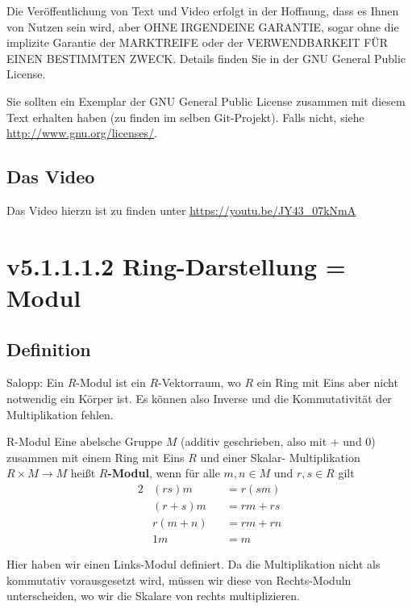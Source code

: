 \documentclass[a4paper]{amsart}
\theoremstyle{definition}
\begin{document}
Die Veröffentlichung von Text und Video erfolgt in der Hoffnung, dass es Ihnen von Nutzen sein wird,
aber OHNE IRGENDEINE GARANTIE, sogar ohne die implizite Garantie der MARKTREIFE oder der
VERWENDBARKEIT FÜR EINEN BESTIMMTEN ZWECK. Details finden Sie in der GNU General Public License.

Sie sollten ein Exemplar der GNU General Public License zusammen mit diesem Text erhalten haben
(zu finden im selben Git-Projekt).
Falls nicht, siehe \url{http://www.gnu.org/licenses/}.

\subsection*{Das Video}
Das Video hierzu ist zu finden unter
{\tiny
   \url{https://youtu.be/JY43_07kNmA}
}

\section{v5.1.1.1.2 Ring-Darstellung = Modul}

\subsection{Definition}
Salopp: Ein $R$-Modul ist ein $R$-Vektorraum, wo $R$ ein Ring mit Eins aber nicht notwendig ein Körper ist. Es können also Inverse und die Kommutativität der Multiplikation fehlen.

\begin{Definition}{R-Modul}
   Eine abelsche Gruppe $M$ (additiv geschrieben, also mit $+$ und $0$) zusammen mit einem  Ring mit Eins $R$ und einer Skalar- Multiplikation $R \times M \to M$ heißt $R$\textbf{-Modul}, wenn für alle $m,n \in M$ und $r, s \in R$ gilt
   \begin{alignat}{2}
      &(rs)m &&= r(sm)\\
      &(r+s)m &&= rm + rs\\
      &r(m+n) &&= rm +rn\\
      &1m &&= m
   \end{alignat}
\end{Definition}
Hier haben wir einen Links-Modul definiert. Da die Multiplikation nicht als kommutativ vorausgesetzt wird, müssen wir diese von Rechts-Moduln unterscheiden, wo wir die Skalare von rechts multiplizieren. 
\end{document}
